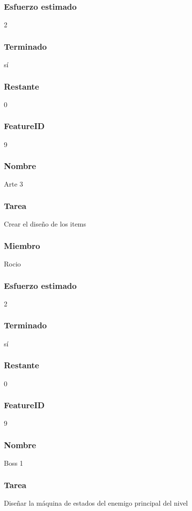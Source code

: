 \subsubsection{Esfuerzo estimado} 2
\subsubsection{Terminado} sí
\subsubsection{Restante} 0


\subsubsection{FeatureID} 9
\subsubsection{Nombre} Arte 3
\subsubsection{Tarea} Crear el diseño de los items
\subsubsection{Miembro} Rocio
\subsubsection{Esfuerzo estimado} 2
\subsubsection{Terminado} sí
\subsubsection{Restante} 0

\subsubsection{FeatureID} 9
\subsubsection{Nombre} Boss 1
\subsubsection{Tarea} Diseñar la máquina de estados del enemigo principal del nivel
